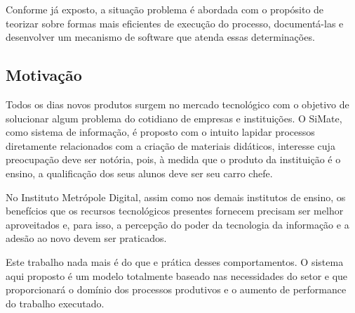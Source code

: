 Conforme já exposto, a situação problema é abordada com o propósito de teorizar sobre formas mais eficientes de execução do processo, documentá-las e desenvolver um mecanismo de software que atenda essas determinações.

\subsection{Motivação}

Todos os dias novos produtos surgem no mercado tecnológico com o objetivo de solucionar algum problema do cotidiano de empresas e instituições. O SiMate, como sistema de informação, é proposto com o intuito lapidar processos diretamente relacionados com a criação de materiais didáticos, interesse cuja preocupação deve ser notória, pois, à medida que o produto da instituição é o ensino, a qualificação dos seus alunos deve ser seu carro chefe.

No Instituto Metrópole Digital, assim como nos demais institutos de ensino, os benefícios que os recursos tecnológicos presentes fornecem precisam ser melhor aproveitados e, para isso, a percepção do poder da tecnologia da informação e a adesão ao novo devem ser praticados. 

Este trabalho nada mais é do que e prática desses comportamentos. O sistema aqui proposto é um modelo totalmente baseado nas necessidades do setor e que proporcionará o domínio dos processos produtivos e o aumento de performance do trabalho executado.
